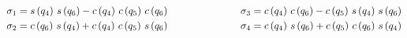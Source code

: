 \documentclass[11pt, a4paper]{article}
\begin{document}
\begin{lrbox}{\rotpagebox}
\begin{minipage}[t][\textwidth][t]{\textheight}
\begin{matlabsymbolicoutput}
\[
\begin{aligned}
\sigma_1 &= s\left(q_4 \right)\,s\left(q_6 \right)-c\left(q_4 \right)\,c\left(q_5 \right)\,c\left(q_6 \right) &\hspace{2.2cm} \sigma_3 &= c\left(q_4 \right)\,c\left(q_6 \right)-c\left(q_5 \right)\,s\left(q_4 \right)\,s\left(q_6 \right) \\
\sigma_2 &= c\left(q_6 \right)\,s\left(q_4 \right)+c\left(q_4 \right)\,c\left(q_5 \right)\,s\left(q_6 \right) &\hspace{2.2cm} \sigma_4 &= c\left(q_4 \right)\,s\left(q_6 \right)+c\left(q_5 \right)\,c\left(q_6 \right)\,s\left(q_4 \right)
\end{aligned}
\]
\end{matlabsymbolicoutput}
\end{minipage}

\end{lrbox}
\noindent{}
\end{document}
